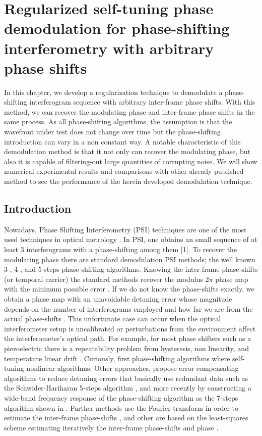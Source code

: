 \chapter{Regularized self-tuning phase demodulation for phase-shifting
interferometry with arbitrary phase shifts}

In this chapter, we develop a regularization technique to demodulate
a phase-shifting interferogram sequence with arbitrary inter-frame
phase shifts. With this method, we can recover the modulating phase
and inter-frame phase shifts in the same process. As all phase-shifting
algorithms, the assumption is that the wavefront under test does not
change over time but the phase-shifting introduction can vary in a
non constant way. A notable characteristic of this demodulation method
is that it not only can recover the modulating phase, but also it
is capable of filtering-out large quantities of corrupting noise.
We will show numerical experimental results and comparisons with other
already published method to see the performance of the herein developed
demodulation technique.

\section{Introduction}

Nowadays, Phase Shifting Interferometry (PSI) techniques are one of
the most used techniques in optical metrology \cite{Malacara}. In PSI, one
obtains an small sequence of at least 3 interferograms with a phase-shifting
among them {[}1{]}. To recover the modulating phase there are standard
demodulation PSI methods; the well known 3-, 4-, and 5-steps phase-shifting
algorithms. Knowing the inter-frame phase-shifts (or temporal carrier)
the standard methods recover the modulus 2$\pi$ phase map with the
minimum possible error \cite{Malacara,Freischlad:90,Servin:09}. If we
do not know the phase-shifts exactly, we obtain a phase map with an
unavoidable detuning error whose magnitude depends on the number of
interferograms employed and how far we are from the actual phase-shifts
\cite{Servin:09,Schwider:83,Ai:87,Larkin:01,Langoju:06}. This unfortunate case
can occur when the optical
interferometer setup is uncalibrated or perturbations from the environment
affect the interferometer\textquoteright{}s optical path. For example,
for most phase shifters such as a piezoelectric there is a repeatability 
problem from hysteresis, non linearity, and temperature linear drift
\cite{Ai:87,Cheng:85}.
Curiously, first phase-shifting algorithms where self-tuning nonlinear
algorithms. Other approaches, propose error compensating
algorithms to reduce detuning errors that basically use redundant
data such as the Schwider-Hariharan 5-steps algorithm
\cite{Schwider:83,Hariharan:87,Surrel:93},
and more recently by constructing a wide-band frequency response of
the phase-shifting algorithm as the 7-steps algorithm shown in
\cite{Estrada:09}.
Further methods use the Fourier transform in order to estimate the
inter-frame phase-shifts \cite{Larkin:01,Lai:91}, and other are based on the
least-squares scheme estimating iteratively the inter-frame phase-shifts
and phase \cite{Kong,Wang:04}.


